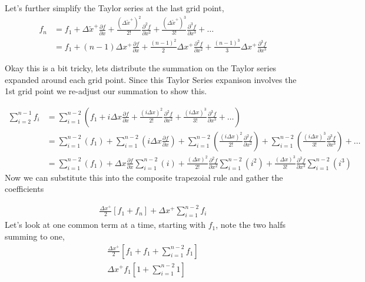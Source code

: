Let's further simplify the Taylor series at the last grid point,
\begin{align*} 
    f_n &= f_1 + 
    \Delta \widetilde{x}^+\frac{\partial f }{\partial x  } +
    \frac{(\Delta \widetilde{x}^+)^2}{2!}\frac{\partial^2 f }{\partial x^2  } +
    \frac{(\Delta \widetilde{x}^+)^3}{3!}\frac{\partial^3 f }{\partial x^3  } + \dots \\
        &= 
        f_1 +
        \left( n - 1 \right)\Delta x^+ 
        \frac{\partial f}{\partial x} +
        \frac{\left( n - 1 \right)^2}{2}\Delta x^+ 
        \frac{\partial^2 f}{\partial x^2} +
        \frac{\left( n - 1 \right)^3}{3}\Delta x^+ 
        \frac{\partial^3 f}{\partial x^3}
\end{align*}

Okay this is a bit tricky, lets distribute the summation on the Taylor series 
expanded around each grid point. Since this Taylor Series expanison involves 
the 1st grid point we re-adjust our summation to show this.

\begin{align*}
    \sum_{i = 2}^{n - 1} f_i  &= 
    \sum_{i = 1}^{n - 2} \left( 
    f_1 +
    i\Delta x \frac{\partial f }{\partial x } +
    \frac{(i\Delta x)^2}{2!} \frac{\partial^2 f }{\partial x^2 } +
    \frac{(i\Delta x)^3}{3!} \frac{\partial^3 f }{\partial x^3 } + \dots
    \right) \\
                              &=
    \sum_{i = 1}^{n - 2} \left( 
    f_1 \right) +
    \sum_{i = 1}^{n - 2} \left( 
    i\Delta x \frac{\partial f }{\partial x }\right) +
    \sum_{i = 1}^{n - 2} \left( 
    \frac{(i\Delta x)^2}{2!} \frac{\partial^2 f }{\partial x^2 } \right)+
    \sum_{i = 1}^{n - 2} \left( 
    \frac{(i\Delta x)^3}{3!} \frac{\partial^3 f }{\partial x^3 } \right)+ \dots\\ 
                              &=
    \sum_{i = 1}^{n - 2} \left( 
    f_1 \right) +
 \Delta x \frac{\partial f }{\partial x }   
     \sum_{i = 1}^{n - 2} \left( i\right) +
    \frac{(\Delta x)^2}{2!} \frac{\partial^2 f }{\partial x^2 } 
    \sum_{i = 1}^{n - 2} \left( i^2 \right)
    +
    \frac{(\Delta x)^3}{3!} \frac{\partial^3 f }{\partial x^3 } 
    \sum_{i = 1}^{n - 2} \left( i^3 \right)
\end{align*} 
Now we can  substitute this into the composite trapezoial rule and gather the coefficients 


\begin{align*}
    \frac{\Delta x^+ }{2}\left[ f_1 + f_n \right] + \Delta x^+ \sum_{i=1}^{n-2} f_i 
\end{align*}
Let's look at one common term at a time, starting with $f_1$, note the two halfs
summing to one,
\begin{align*} \frac{\Delta x^+}{2}\left[ f_1 + f_1 + \sum_{i=1}^{n-2} f_1 \right] \\
    \Delta x^+ f_1\left[ 1 + \sum_{i=1}^{n-2}1 \right]
\end{align*}

